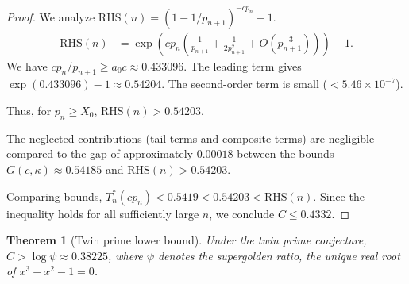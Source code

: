 \documentclass[12pt]{article}
\theoremstyle{plain}
\newtheorem{theorem}{Theorem}
\theoremstyle{definition}
\theoremstyle{remark}
\begin{document}
\begin{proof}
We analyze $\text{RHS}(n) = (1 - 1/p_{n+1})^{-cp_n} - 1$.
\begin{align*}
\text{RHS}(n) &= \exp\left(cp_n \left(\frac{1}{p_{n+1}} + \frac{1}{2p_{n+1}^2} + O(p_{n+1}^{-3})\right)\right) - 1.
\end{align*}
We have $cp_n/p_{n+1} \geq a_0 c \approx 0.433096$. The leading term gives $\exp(0.433096) - 1 \approx 0.54204$.
The second-order term is small ($< 5.46 \times 10^{-7}$).

Thus, for $p_n \geq X_0$, $\text{RHS}(n) > 0.54203$.

The neglected contributions (tail terms and composite terms) are negligible compared to the gap of approximately $0.00018$ between the bounds $G(c,\kappa) \approx 0.54185$ and $\text{RHS}(n) > 0.54203$.

Comparing bounds, $T_n^*(cp_n) < 0.5419 < 0.54203 < \text{RHS}(n)$.
Since the inequality holds for all sufficiently large $n$, we conclude $C \leq 0.4332$.
\end{proof}

\begin{theorem}[Twin prime lower bound]
\label{thm:twin}
Under the twin prime conjecture, $C > \log \psi \approx 0.38225$, where $\psi$ denotes the supergolden ratio, the unique real root of $x^3 - x^2 - 1 = 0$.
\end{theorem}
\end{document}
